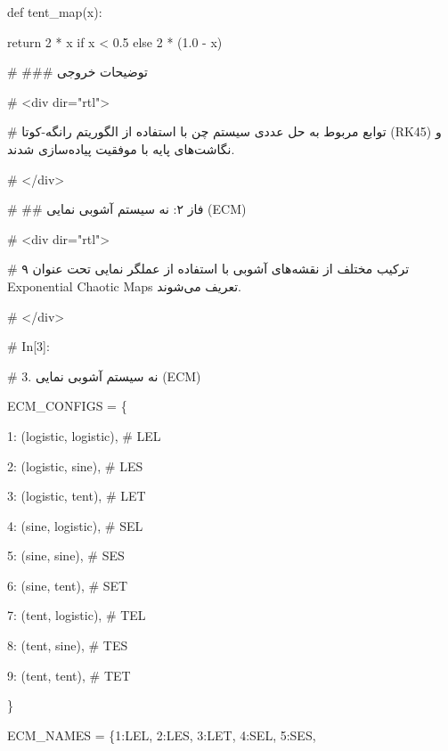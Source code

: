 def tent\_map(x):

return 2 * x if x \textless{} 0.5 else 2 * (1.0 - x)

\# \#\#\# توضیحات خروجی

\# \textless div dir="rtl"\textgreater{}

\# توابع مربوط به حل عددی سیستم چن با استفاده از الگوریتم رانگه-کوتا (RK45) و نگاشت‌های پایه با موفقیت پیاده‌سازی شدند.

\# \textless/div\textgreater{}

\# \#\# فاز ۲: نه سیستم آشوبی نمایی (ECM)

\# \textless div dir="rtl"\textgreater{}

\# ۹ ترکیب مختلف از نقشه‌های آشوبی با استفاده از عملگر نمایی تحت عنوان Exponential Chaotic Maps تعریف می‌شوند.

\# \textless/div\textgreater{}

\# In{[}3{]}:

\# 3. نه سیستم آشوبی نمایی (ECM)

ECM\_CONFIGS = \{

1: (\textquotesingle logistic\textquotesingle, \textquotesingle logistic\textquotesingle), \# LEL

2: (\textquotesingle logistic\textquotesingle, \textquotesingle sine\textquotesingle), \# LES

3: (\textquotesingle logistic\textquotesingle, \textquotesingle tent\textquotesingle), \# LET

4: (\textquotesingle sine\textquotesingle, \textquotesingle logistic\textquotesingle), \# SEL

5: (\textquotesingle sine\textquotesingle, \textquotesingle sine\textquotesingle), \# SES

6: (\textquotesingle sine\textquotesingle, \textquotesingle tent\textquotesingle), \# SET

7: (\textquotesingle tent\textquotesingle, \textquotesingle logistic\textquotesingle), \# TEL

8: (\textquotesingle tent\textquotesingle, \textquotesingle sine\textquotesingle), \# TES

9: (\textquotesingle tent\textquotesingle, \textquotesingle tent\textquotesingle), \# TET

\}

ECM\_NAMES = \{1:\textquotesingle LEL\textquotesingle, 2:\textquotesingle LES\textquotesingle, 3:\textquotesingle LET\textquotesingle, 4:\textquotesingle SEL\textquotesingle, 5:\textquotesingle SES\textquotesingle,

